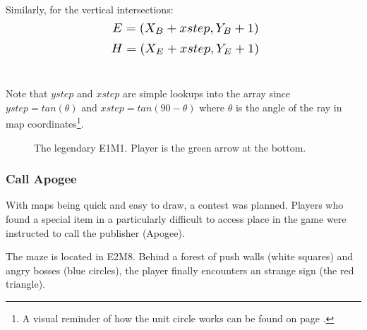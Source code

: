 \par
Similarly, for the vertical intersections:\\
  \begin{equation*}
    \scalebox{1.3}{

$E = (X_{B} + xstep, Y_{B} + 1)$\\
}
\end{equation*}
  \begin{equation*}
    \scalebox{1.3}{
$H = (X_{E} + xstep, Y_{E} + 1)$\\
}
\end{equation*}\\
\par
Note that $ystep$ and $xstep$ are simple lookups into the  array since $ystep=tan(\theta)$ and $xstep=tan(90-\theta)$ where $\theta$ is the angle of the ray in map coordinates\footnote{A visual reminder of how the unit circle works can be found on page \pageref{unit_circle_label}.}.\\
\par
\begin{figure}[H]
  \centering
 \label{mape1m1}
 \caption{The legendary E1M1. Player is the green arrow at the bottom.}
\end{figure}


\subsubsection{Call Apogee}
With maps being quick and easy to draw, a contest was planned. Players who found a special item in a particularly difficult to access place in the game were instructed to call the publisher (Apogee).\\
\par The maze is located in E2M8. Behind a forest of push walls (white squares) and angry bosses (blue circles), the player finally encounters an strange sign (the red triangle).


